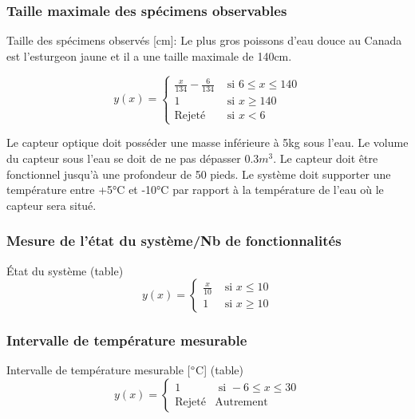 \subsubsection{Taille maximale des spécimens observables}
Taille des spécimens observés [cm]:
Le plus gros poissons d'eau douce au Canada est l'esturgeon jaune \cite{Esturgeon} et il a une taille maximale de 140cm.

\begin{equation}
y(x) = \begin{cases}
        \frac{x}{134}- \frac{6}{134} & \text{ si } 6 \leq x \leq 140\\
        1 & \text{ si } x \geq 140\\
        \text{Rejeté} & \text{ si } x < 6
    \end{cases}
    \label{eq:bareme_taille_poisson}
\end{equation}

Le capteur optique doit posséder une masse inférieure à 5kg sous l'eau. Le volume du capteur sous l'eau se doit de ne pas dépasser 0.3$m^{3}$. Le capteur doit être fonctionnel jusqu'à une profondeur de 50 pieds. Le système doit supporter une température entre +5°C et -10°C par rapport à la température de l'eau où le capteur sera situé.


\subsubsection{Mesure de l'état du système/Nb de fonctionnalités}

État du système (table)
\begin{equation}
    y(x) = \begin{cases}
    \frac{x}{10} & \text{ si } x \leq 10\\
    1 & \text{ si } x \geq 10
    \end{cases}
    \label{eq:bareme_etat_systeme}
\end{equation}

\subsubsection{Intervalle de température mesurable}
Intervalle de température mesurable [$\degree$C] (table)
\begin{equation}
y(x) = \begin{cases}
    1 & \text{ si } -6 \leq x \leq 30\\
    \text{Rejeté} & \text{Autrement}
    \end{cases}
    \label{eq:bareme_mesure_temperature}
\end{equation}

